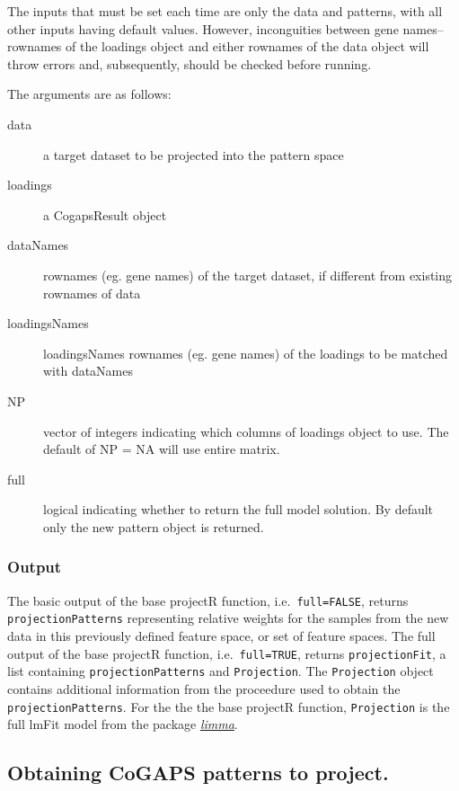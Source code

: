 \documentclass[]{article}
\begin{document}
The inputs that must be set each time are only the data and patterns, with all other inputs having default values. However, inconguities between gene names--rownames of the loadings object and either rownames of the data object will throw errors and, subsequently, should be checked before running.

The arguments are as follows:

\begin{description}
\item[data]{a target dataset to be projected into the pattern space}
\item[loadings]{a CogapsResult object}
\item[dataNames]{rownames (eg. gene names) of the target dataset, if different from existing rownames of data}
\item[loadingsNames] loadingsNames rownames (eg. gene names) of the loadings to be matched with dataNames
\item[NP]{vector of integers indicating which columns of loadings object to use. The default of NP = NA will use entire matrix.}
\item[full]{logical indicating whether to return the full model solution. By default only the new pattern object is returned.}
\end{description}

\hypertarget{output-1}{%
\subsubsection{Output}\label{output-1}}

The basic output of the base projectR function, i.e.~\texttt{full=FALSE}, returns \texttt{projectionPatterns} representing relative weights for the samples from the new data in this previously defined feature space, or set of feature spaces. The full output of the base projectR function, i.e.~\texttt{full=TRUE}, returns \texttt{projectionFit}, a list containing \texttt{projectionPatterns} and \texttt{Projection}. The \texttt{Projection} object contains additional information from the proceedure used to obtain the \texttt{projectionPatterns}. For the the the base projectR function, \texttt{Projection} is the full lmFit model from the package \emph{\href{https://bioconductor.org/packages/3.9/limma}{limma}}.

\hypertarget{obtaining-cogaps-patterns-to-project.}{%
\subsection{Obtaining CoGAPS patterns to project.}\label{obtaining-cogaps-patterns-to-project.}}
\end{document}
